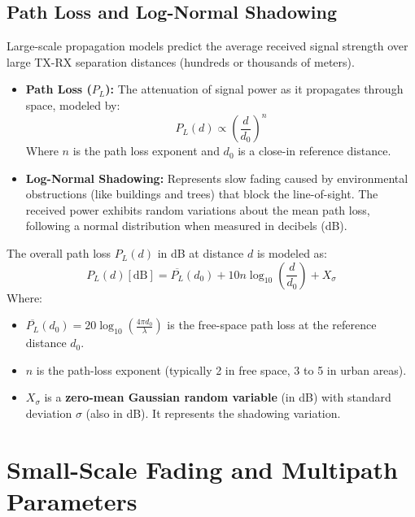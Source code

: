 \documentclass[12pt,a4paper]{article}
\begin{document}
\subsection{Path Loss and Log-Normal Shadowing}
Large-scale propagation models predict the average received signal strength over large TX-RX separation distances (hundreds or thousands of meters).
\begin{itemize}[leftmargin=*, itemsep=3.0pt]
  \item \textbf{Path Loss ($P_L$):} The attenuation of signal power as it propagates through space, modeled by:
    \begin{equation}
      P_L(d) \propto \left(\frac{d}{d_0}\right)^n
    \end{equation}
    Where $n$ is the path loss exponent and $d_0$ is a close-in reference distance.
  \item \textbf{Log-Normal Shadowing:} Represents slow fading caused by environmental obstructions (like buildings and trees) that block the line-of-sight. The received power exhibits random variations about the mean path loss, following a normal distribution when measured in decibels (dB).
\end{itemize}

\begin{tcolorbox}[formulabox, title={\textbf{Log-Normal Shadowing Model}}]
The overall path loss $P_L(d)$ in dB at distance $d$ is modeled as:
\begin{equation}
  P_L(d)[\text{dB}] = \overline{P_L}(d_0) + 10 n \log_{10}\left(\frac{d}{d_0}\right) + X_\sigma
\end{equation}
Where:
\begin{itemize}[leftmargin=*, itemsep=2pt, topsep=2pt]
  \item $\overline{P_L}(d_0) = 20\log_{10}\left(\frac{4\pi d_0}{\lambda}\right)$ is the free-space path loss at the reference distance $d_0$.
  \item $n$ is the path-loss exponent (typically 2 in free space, 3 to 5 in urban areas).
  \item $X_\sigma$ is a \textbf{zero-mean Gaussian random variable} (in dB) with standard deviation $\sigma$ (also in dB). It represents the shadowing variation.
\end{itemize}
\end{tcolorbox}

\section{Small-Scale Fading and Multipath Parameters}
\end{document}
